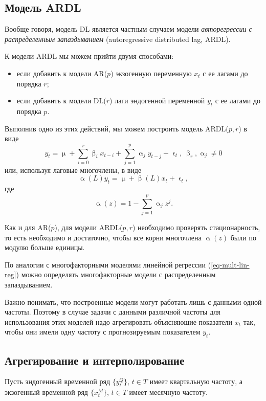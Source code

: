 \documentclass[a4paper, 14pt]{extreport}
\numberwithin{equation}{section}
\renewcommand{\alpha}{\upalpha}
\renewcommand{\beta}{\upbeta}
\renewcommand{\epsilon}{\upvarepsilon}
\renewcommand{\mu}{\upmu}
\numberwithin{equation}{section}
\begin{document}
	\subsection{Модель ARDL}
	Вообще говоря, модель DL является частным случаем модели \textit{авторегрессии с распределенным запаздыванием} (autoregressive distributed lag, ARDL).
	
	К модели ARDL мы можем прийти двумя способами:
	\begin{itemize}
		\item если добавить к модели AR($p$) экзогенную переменную $x_t$ с ее лагами до порядка $r$;
		\item если добавить к модели DL($r$) лаги эндогенной переменной $y_t$ с ее лагами до порядка $p$.
	\end{itemize}
	Выполнив одно из этих действий, мы можем построить модель ARDL($p, r$) в виде
	\begin{equation}
		y_{t} = \mu + \sum_{i=0}^{r}\beta_i x_{t-i} + \sum_{j=1}^{p} \alpha_j y_{t-j} + \epsilon_t,\ \beta_r,\alpha_j \ne 0
	\end{equation}
	или, используя лаговые многочлены, в виде
	\begin{equation}
		\alpha(L)y_t = \mu + \beta(L) x_t + \epsilon_t,
 	\end{equation}
 	где \begin{equation*}
 		\alpha(z) = 1 - \sum_{j=1}^{p}\alpha_jz^j.
 	\end{equation*}

	Как и для AR($p$), для модели ARDL($p,r$) необходимо проверять стационарность, то есть необходимо и достаточно, чтобы все корни многочлена $\alpha(z)$ были по модулю больше единицы.
	
	По аналогии с многофакторными моделями линейной регрессии (\ref{eq-mult-lin-reg}) можно определять многофакторные модели с распределенным запаздыванием.
	
	Важно понимать, что построенные модели могут работать лишь с данными одной частоты. Поэтому в случае задачи с данными различной частоты для использования этих моделей надо агрегировать объясняющие показатели $x_t$ так, чтобы они имели одну частоту с прогнозируемым показателем $y_t$. 
	
	\subsection{Агрегирование и интерполирование}
	\label{subsec:agreg}
	
	Пусть эндогенный временной ряд $\{y_t^Q\}$, $t \in T$ имеет квартальную частоту, а экзогенный временной ряд $\{x_t^M\}$, $t \in T$ имеет месячную частоту.
	
\end{document}
